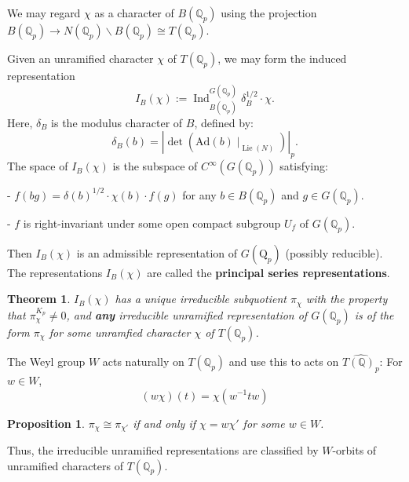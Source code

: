 \documentclass[11pt,english]{smfart}
\newtheorem{theorem}{Theorem}
\newtheorem{proposition}{Proposition}[section]
\theoremstyle{definition}
\theoremstyle{remark}
\begin{document}
We may regard $ \chi $ as a character of $ B\left(\mathbb{Q}_{p}\right) $ using the projection $ B\left(\mathbb{Q}_{p}\right) \rightarrow N\left(\mathbb{Q}_{p}\right) \backslash B\left(\mathbb{Q}_{p}\right) \cong   T\left(\mathbb{Q}_{p}\right)$.

Given an unramified character $ \chi $ of $ T\left(\mathbb{Q}_{p}\right) $, we may form the induced representation
\[I_{B}(\chi):=\operatorname{Ind}_{B\left(\mathbb{Q}_{p}\right)}^{G\left(\mathbb{Q}_{p}\right)} \delta_{B}^{1 / 2} \cdot \chi .\]
Here, $ \delta_{B} $ is the modulus character of $ B $, defined by:
\[\delta_{B}(b)=|\operatorname{det}(\mathrm{Ad}(b) \mid_{\operatorname{Lie}(N)})|_{p} .\]
The space of $ I_{B}(\chi) $ is the subspace of $ C^{\infty}\left(G\left(\mathbb{Q}_{p}\right)\right) $ satisfying:

- $f(b g)=\delta(b)^{1 / 2} \cdot \chi(b) \cdot f(g) $ for any $ b \in B\left(\mathbb{Q}_{p}\right) $ and $ g \in G\left(\mathbb{Q}_{p}\right) $.

- $ f $ is right-invariant under some open compact subgroup $ U_{f} $ of $ G\left(\mathbb{Q}_{p}\right) $.

Then $ I_{B}(\chi) $ is an admissible representation of $ G\left(\mathrm{Q}_{p}\right) $ (possibly reducible). The representations $ I_{B}(\chi) $ are called the \textbf{principal series representations}.
\begin{theorem}
$ I_{B}(\chi) $ has a unique irreducible subquotient $ \pi_{\chi} $ with the property that $ \pi_{\chi}^{K_{p}} \neq 0 $, and \textbf{any} irreducible unramified representation of $ G\left(\mathbb{Q}_{p}\right) $ is of the form $ \pi_{\chi} $ for some unramfied character $ \chi $ of $ T\left(\mathbb{Q}_{p}\right) $.
\end{theorem}
The Weyl group $W$ acts naturally on $T(\mathbb{Q}_p)$ and use this to acts on $\widehat{T(\mathbb{Q})_p} $: For $w\in W$,
\[(w\chi) (t)=\chi (w^{-1}t w)\]
\begin{proposition}
$ \pi_{\chi} \cong \pi_{\chi'}$ if and only if $\chi= w \chi'$ for some $w \in W$.
\end{proposition}
Thus, the irreducible unramified representations are classified by $W$-orbits of unramified
characters of $T(\mathbb{Q}_p)$.
\end{document}
